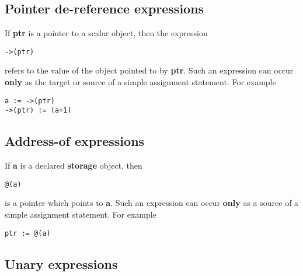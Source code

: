 \documentclass{article}
\begin{document}
\subsection{Pointer de-reference expressions}

If {\bf ptr} is a pointer to a scalar object,
then the expression 
\begin{verbatim}
->(ptr)
\end{verbatim}
refers to the value of the object pointed to
by {\bf ptr}.
Such an expression can occur {\bf only} as 
the target or source of a simple assignment statement.
For example
\begin{verbatim}
a := ->(ptr)
->(ptr) := (a+1)
\end{verbatim}

\subsection{Address-of expressions}

If {\bf a} is a declared {\bf storage} object,
then
\begin{verbatim}
@(a)
\end{verbatim}
is a pointer which points to {\bf a}.  Such 
an expression can occur {\bf only} as a source
of a simple assignment statement.
For example
\begin{verbatim}
ptr := @(a)
\end{verbatim}

\subsection{Unary expressions}
\end{document}
